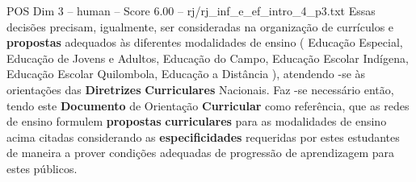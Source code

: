 \begin{textsample}{POS Dim 3 – human – Score 6.00 – rj/rj\_inf\_e\_ef\_intro\_4\_p3.txt}  \label{ex:f3_pos_012}
Essas decisões precisam, igualmente, ser consideradas na organização de currículos e \textbf{propostas} adequados às diferentes modalidades de ensino ( Educação Especial, Educação de Jovens e Adultos, Educação do Campo, Educação Escolar Indígena, Educação Escolar Quilombola, Educação a Distância ), atendendo -se às orientações das \textbf{Diretrizes} \textbf{Curriculares} Nacionais.
Faz -se necessário então, tendo este \textbf{Documento} de Orientação \textbf{Curricular} como referência, que as redes de ensino formulem \textbf{propostas} \textbf{curriculares} para as modalidades de ensino acima citadas considerando as \textbf{especificidades} requeridas por estes estudantes de maneira a prover condições adequadas de progressão de aprendizagem para estes públicos.

\end{textsample}
